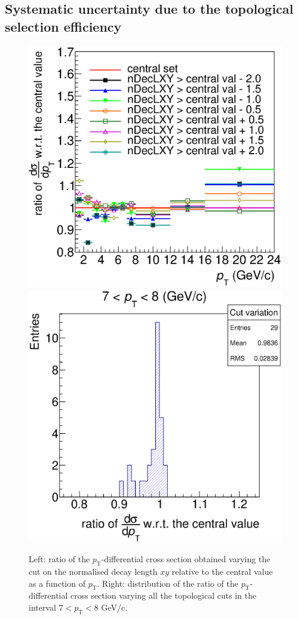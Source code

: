 \documentclass[b5paper,10pt,twoside,oldstyle,classica]{toptesi}
\newcommand{\pt}{p_\text{T}}
\begin{document}
\subsection{Systematic uncertainty due to the topological selection efficiency}
\label{KF_syst_cutvar}
\begin{figure}[tb]
\begin{center}
{\includegraphics[scale = 0.31]{KF_CutVarSyst_ratioonly_nDecLXY.eps}}
\hspace{-0.5cm}
{\includegraphics[scale = 0.31]{KF_CutVarSyst_Disp_Pt6.eps}}
\caption{Left: ratio of the $\pt$-differential cross section obtained varying the cut on the normalised decay length $xy$ relative to the central value as a function of $\pt$. Right: distribution of the ratio of the $\pt$-differential cross section varying all the topological cuts in the interval $7<\pt<8$ GeV/c.}
\label{KF_cutvar_syst}
\end{center}
\end{figure} 
\end{document}

